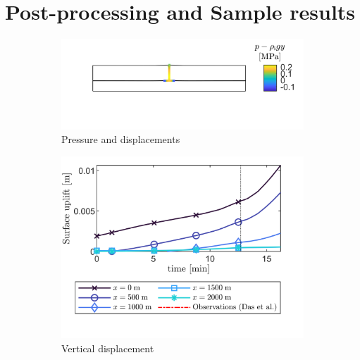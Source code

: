 \documentclass[3p]{elsarticle} %
\begin{document}
\section{Post-processing and Sample results}
\begin{figure}
     \centering
     \begin{subfigure}[b]{8cm}
         \centering
         \includegraphics{../Figures/PSurf.png}
         \caption{Pressure and displacements}
         \label{fig:1}
     \end{subfigure}
     \begin{subfigure}[b]{8cm}
         \centering
         \includegraphics{../Figures/Uplift.png}
         \caption{Vertical displacement}
         \label{fig:2}
     \end{subfigure}
     \begin{subfigure}[b]{8cm}
         \centering

\end{subfigure}
\end{figure}
\end{document}
